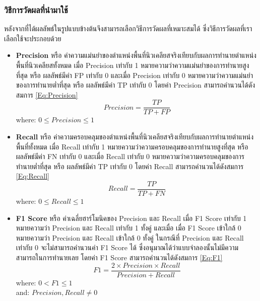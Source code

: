 \documentclass[12pt,oneside,openright,a4paper]{cpe-thai-project}
\begin{document}
\subsubsection{วิธีการวัดผลที่นำมาใช้}
หลังจากที่ได้ผลลัพธ์ในรูปแบบข้างต้นจึงสามารถเลือกวิธีการวัดผลที่เหมาะสมได้ ซึ่งวิธีการวัดผลที่เราเลือกใช้จะประกอบด้วย
\begin{itemize}
\item \textbf{Precision} หรือ ค่าความแม่นยำของตำแหน่งพื้นที่นิวเคลียสจริงเทียบกับผลการทำนายตำแหน่งพื้นที่นิวเคลียสทั้งหมด เมื่อ Precision เท่ากับ 1 หมายความว่าความแม่นยำของการทำนายสูงที่สุด หรือ ผลลัพธ์มีค่า FP เท่ากับ 0 และเมื่อ Precision เท่ากับ 0 หมายความว่าความแม่นยำของการทำนายต่ำที่สุด หรือ ผลลัพธ์มีค่า TP เท่ากับ 0 โดยค่า Precision สามารถคำนวนได้ดังสมการ \ref{Eq:Precision}
    \begin{equation}
        Precision = \frac{TP}{TP + FP} \label{Eq:Precision}
    \end{equation}
    where:  $0 \leq Precision \leq 1$
    
\item \textbf{Recall} หรือ ค่าความครอบคลุมของตำแหน่งพื้นที่นิวเคลียสจริงเทียบกับผลการทำนายตำแหน่งพื้นที่ทั้งหมด เมื่อ Recall เท่ากับ 1 หมายความว่าความครอบคลุมของการทำนายสูงที่สุด หรือ ผลลัพธ์มีค่า FN เท่ากับ 0 และเมื่อ Recall เท่ากับ 0 หมายความว่าความครอบคลุมของการทำนายต่ำที่สุด หรือ ผลลัพธ์มีค่า TP เท่ากับ 0 โดยค่า Recall สามารถคำนวนได้ดังสมการ \ref{Eq:Recall}
    \begin{equation}
        Recall = \frac{TP}{TP + FN} \label{Eq:Recall}
    \end{equation}
    where:  $0 \leq Recall \leq 1$
    
\item \textbf{F1 Score} หรือ ค่าเฉลี่ยฮาร์โมนิคของ Precision และ Recall เมื่อ F1 Score เท่ากับ 1 หมายความว่า Precision และ Recall เท่ากับ 1 ทั้งคู่ และเมื่อ เมื่อ F1 Score เข้าใกล้ 0 หมายความว่า Precision และ Recall เข้าใกล้ 0 ทั้งคู่ ในกรณีที่ Precision และ Recall เท่ากับ 0 จะไม่สามารถคำนวนค่า F1 Score ได้ ซึ่งอนุมาณได้ว่าแบบจำลองนั้นไม่มีความสามารถในการทำนายเลย โดยค่า F1 Score สามารถคำนวนได้ดังสมการ \ref{Eq:F1}
    \begin{equation}
        F1 = \frac{2 \times Precision \times Recall}{Precision + Recall} \label{Eq:F1}
    \end{equation}
    where:  $0 < F1 \leq 1$  \\
    and: $Precision, Recall \neq 0$
    

\end{itemize}
\end{document}
